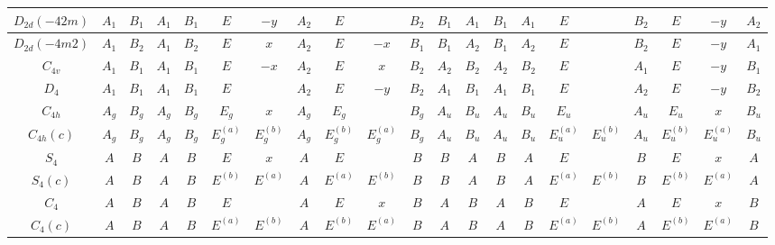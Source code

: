 \documentclass[11pt]{easymemo}
\begin{document}
\begin{landscape}
\begin{table}[ht!]
\begin{center}
\begin{tabular}{c||c|c|cc|ccc|ccc||c|c|cc|ccc|ccc}
$ D_{2d}(-42m) $ & $ A_{1} $ & $ B_{1} $ & $ A_{1} $ & $ B_{1} $ & $ E $ & $ -y $ & $ A_{2} $ & $ E $ & & $ B_{2} $ & $ B_{1} $ & $ A_{1} $ & $ B_{1} $ & $ A_{1} $ & $ E $ & & $ B_{2} $ & $ E $ & $ -y $ & $ A_{2} $ \\ \hline
$ D_{2d}(-4m2) $ & $ A_{1} $ & $ B_{2} $ & $ A_{1} $ & $ B_{2} $ & $ E $ & $ x $ & $ A_{2} $ & $ E $ & $ -x $ & $ B_{1} $ & $ B_{1} $ & $ A_{2} $ & $ B_{1} $ & $ A_{2} $ & $ E $ & & $ B_{2} $ & $ E $ & $ -y $ & $ A_{1} $ \\ \hline
$ C_{4v} $ & $ A_{1} $ & $ B_{1} $ & $ A_{1} $ & $ B_{1} $ & $ E $ & $ -x $ & $ A_{2} $ & $ E $ & $ x $ & $ B_{2} $ & $ A_{2} $ & $ B_{2} $ & $ A_{2} $ & $ B_{2} $ & $ E $ & & $ A_{1} $ & $ E $ & $ -y $ & $ B_{1} $ \\ \hline
$ D_{4} $ & $ A_{1} $ & $ B_{1} $ & $ A_{1} $ & $ B_{1} $ & $ E $ & & $ A_{2} $ & $ E $ & $ -y $ & $ B_{2} $ & $ A_{1} $ & $ B_{1} $ & $ A_{1} $ & $ B_{1} $ & $ E $ & & $ A_{2} $ & $ E $ & $ -y $ & $ B_{2} $ \\ \hline
$ C_{4h} $ & $ A_{g} $ & $ B_{g} $ & $ A_{g} $ & $ B_{g} $ & $ E_{g} $ & $ x $ & $ A_{g} $ & $ E_{g} $ & & $ B_{g} $ & $ A_{u} $ & $ B_{u} $ & $ A_{u} $ & $ B_{u} $ & $ E_{u} $ & & $ A_{u} $ & $ E_{u} $ & $ x $ & $ B_{u} $ \\ \hline
$ C_{4h}(c) $ & $ A_{g} $ & $ B_{g} $ & $ A_{g} $ & $ B_{g} $ & $ E_{g}^{(a)} $ & $ E_{g}^{(b)} $ & $ A_{g} $ & $ E_{g}^{(b)} $ & $ E_{g}^{(a)} $ & $ B_{g} $ & $ A_{u} $ & $ B_{u} $ & $ A_{u} $ & $ B_{u} $ & $ E_{u}^{(a)} $ & $ E_{u}^{(b)} $ & $ A_{u} $ & $ E_{u}^{(b)} $ & $ E_{u}^{(a)} $ & $ B_{u} $ \\ \hline
$ S_{4} $ & $ A $ & $ B $ & $ A $ & $ B $ & $ E $ & $ x $ & $ A $ & $ E $ & & $ B $ & $ B $ & $ A $ & $ B $ & $ A $ & $ E $ & & $ B $ & $ E $ & $ x $ & $ A $ \\ \hline
$ S_{4}(c) $ & $ A $ & $ B $ & $ A $ & $ B $ & $ E^{(b)} $ & $ E^{(a)} $ & $ A $ & $ E^{(a)} $ & $ E^{(b)} $ & $ B $ & $ B $ & $ A $ & $ B $ & $ A $ & $ E^{(a)} $ & $ E^{(b)} $ & $ B $ & $ E^{(b)} $ & $ E^{(a)} $ & $ A $ \\ \hline
$ C_{4} $ & $ A $ & $ B $ & $ A $ & $ B $ & $ E $ & & $ A $ & $ E $ & $ x $ & $ B $ & $ A $ & $ B $ & $ A $ & $ B $ & $ E $ & & $ A $ & $ E $ & $ x $ & $ B $ \\ \hline
$ C_{4}(c) $ & $ A $ & $ B $ & $ A $ & $ B $ & $ E^{(a)} $ & $ E^{(b)} $ & $ A $ & $ E^{(b)} $ & $ E^{(a)} $ & $ B $ & $ A $ & $ B $ & $ A $ & $ B $ & $ E^{(a)} $ & $ E^{(b)} $ & $ A $ & $ E^{(b)} $ & $ E^{(a)} $ & $ B $ \\ \hline\hline

\end{tabular}
\end{center}
\end{table}
\end{landscape}
\end{document}
